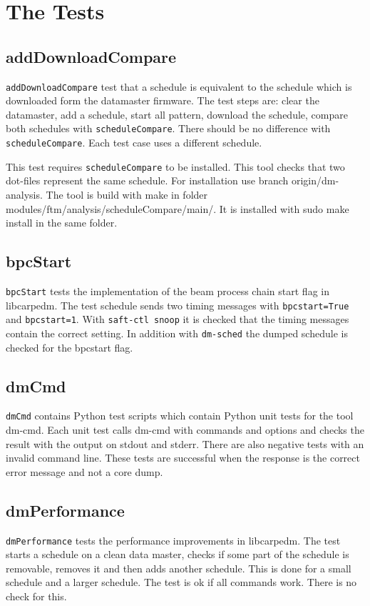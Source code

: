 \documentclass[12pt,a4paper]{report}
\begin{document}
\chapter{The Tests}
\section{addDownloadCompare}
\texttt{addDownloadCompare} test that a schedule is equivalent to the schedule which is downloaded form the datamaster firmware.
The test steps are: clear the datamaster, add a schedule, start all pattern, download the schedule, compare both schedules with \texttt{scheduleCompare}.
There should be no difference with \texttt{scheduleCompare}. Each test case uses a different schedule.

This test requires \texttt{scheduleCompare} to be installed. This tool checks that two dot-files represent the same schedule. For installation use branch
origin/dm-analysis. The tool is build with make in folder modules/ftm/analysis/scheduleCompare/main/. It is installed with sudo make install in the same folder.
\section{bpcStart}
\texttt{bpcStart} tests the implementation of the beam process chain start flag in libcarpedm.
The test schedule sends two timing messages with \texttt{bpcstart=True} and \texttt{bpcstart=1}.
With \texttt{saft-ctl snoop} it is checked that the timing messages contain the correct setting.
In addition with \texttt{dm-sched} the dumped schedule is checked for the bpcstart flag.
\section{dmCmd}
\texttt{dmCmd} contains Python test scripts which contain Python unit tests for the tool dm-cmd. Each unit test calls dm-cmd
with commands and options and checks the result with the output on stdout and stderr. There are also negative tests with an invalid command
line. These tests are successful when the response is the correct error message and not a core dump.
\section{dmPerformance}
\texttt{dmPerformance} tests the performance improvements in libcarpedm.
The test starts a schedule on a clean data master, checks if some part of the schedule is removable, removes it and
then adds another schedule. This is done for a small schedule and a larger schedule. The test is ok if all commands
work. There is no check for this.
\end{document}
